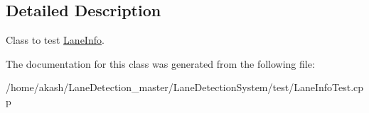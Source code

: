 \subsection{Detailed Description}
Class to test \hyperlink{classLaneInfo}{Lane\+Info}. 

The documentation for this class was generated from the following file\+:\begin{DoxyCompactItemize}
\item 
/home/akash/\+Lane\+Detection\+\_\+master/\+Lane\+Detection\+System/test/Lane\+Info\+Test.\+cpp\end{DoxyCompactItemize}

